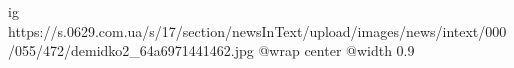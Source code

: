 
 
 
 
 

\ifcmt
  ig https://s.0629.com.ua/s/17/section/newsInText/upload/images/news/intext/000/055/472/demidko2_64a6971441462.jpg
  @wrap center
  @width 0.9
\fi
